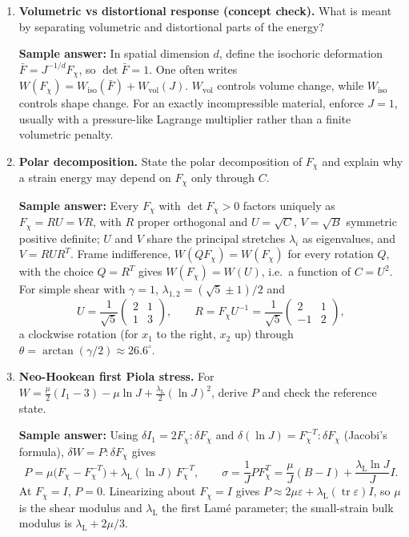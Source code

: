 \documentclass[12pt]{article}
\begin{document}
\begin{enumerate}
\item \textbf{Volumetric vs distortional response (concept check).}
What is meant by separating volumetric and distortional parts of the energy?

\textbf{Sample answer:}
In spatial dimension $d$, define the isochoric deformation
$\bar F=J^{-1/d}F_\chi$, so $\det\bar F=1$. One often writes
$W(F_\chi)=W_{\text{iso}}(\bar F)+W_{\text{vol}}(J)$.
$W_{\text{vol}}$ controls volume change, while $W_{\text{iso}}$ controls shape change.
For an exactly incompressible material, enforce $J=1$, usually with a pressure-like
Lagrange multiplier rather than a finite volumetric penalty.

\item \textbf{Polar decomposition.}
State the polar decomposition of $F_\chi$ and explain why a strain energy may depend on $F_\chi$
only through $C$.

\textbf{Sample answer:}
Every $F_\chi$ with $\det F_\chi>0$ factors uniquely as $F_\chi=RU=VR$, with $R$ proper orthogonal
and $U=\sqrt{C}$, $V=\sqrt{B}$ symmetric positive definite; $U$ and $V$ share the principal stretches
$\lambda_i$ as eigenvalues, and $V=RUR^T$. Frame indifference, $W(QF_\chi)=W(F_\chi)$ for every rotation
$Q$, with the choice $Q=R^T$ gives $W(F_\chi)=W(U)$, i.e.\ a function of $C=U^2$. For simple shear with
$\gamma=1$, $\lambda_{1,2}=(\sqrt5\pm1)/2$ and
\[
U=\frac{1}{\sqrt5}\begin{pmatrix}2&1\\1&3\end{pmatrix},\qquad
R=F_\chi U^{-1}=\frac{1}{\sqrt5}\begin{pmatrix}2&1\\-1&2\end{pmatrix},
\]
a clockwise rotation (for $x_1$ to the right, $x_2$ up) through $\theta=\arctan(\gamma/2)\approx26.6^\circ$.

\item \textbf{Neo-Hookean first Piola stress.}
For $W=\frac{\mu}{2}(I_1-3)-\mu\ln J+\frac{\lambda_{\mathrm L}}{2}(\ln J)^2$, derive $P$ and check the
reference state.

\textbf{Sample answer:}
Using $\delta I_1=2F_\chi:\delta F_\chi$ and $\delta(\ln J)=F_\chi^{-T}:\delta F_\chi$ (Jacobi's formula),
$\delta W=P:\delta F_\chi$ gives
\[
P=\mu\bigl(F_\chi-F_\chi^{-T}\bigr)+\lambda_{\mathrm L}(\ln J)\,F_\chi^{-T},
\qquad
\sigma=\frac{1}{J}PF_\chi^T=\frac{\mu}{J}(B-I)+\frac{\lambda_{\mathrm L}\ln J}{J}I .
\]
At $F_\chi=I$, $P=0$. Linearizing about $F_\chi=I$ gives $P\approx2\mu\varepsilon+\lambda_{\mathrm L}(\operatorname{tr}\varepsilon)I$,
so $\mu$ is the shear modulus and $\lambda_{\mathrm L}$ the first Lam\'e parameter; the small-strain bulk
modulus is $\lambda_{\mathrm L}+2\mu/3$.



\end{enumerate}
\end{document}
